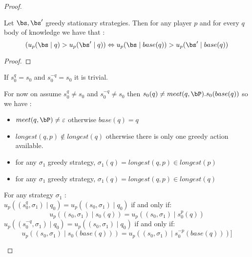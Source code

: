\begin{proof}
	
\begin{mylem}
	\label{lemsup}
	Let $\bs, \bs'$ greedy stationary strategies. Then for any player $p$ and for every $q$ body of knowledge we have that :  $$(u_p(\bs \mid q) > u_p(\bs' \mid q))  \Leftrightarrow  u_p(\bs \mid base(q)) > u_p(\bs' \mid base(q))$$ 
\end{mylem}
\begin{proof}
\end{proof}	
	
If $s^q_0 = s_0$ and  $s^{-q}_0 = s_0$ it is trivial.

For now on assume $s^q_0 \neq s_0$ and $s^{-q}_0 \neq s_0$ then $s_0(q) \neq meet(q,\bP) . s_0(base(q))$ so we have :
\begin{itemize}
	\item $meet(q,\bP) \neq \varepsilon$ otherwise $base(q) = q$
	\item $longest(q,p) \notin longest(q)$ otherwise there is only one greedy action available.
	\item for any $\sigma_1$ greedy strategy, $\sigma_1(q) = longest(q,p)\in longest(p)$ 
	\item for any $\sigma_1$ greedy strategy, $\sigma_1(q) =  longest(q,p)\in longest(q)$ 
\end{itemize}


\begin{mylem}
	\label{lemintermediary}
	For any strategy $\sigma_1$ :
	\\$u_p((s^q_0,\sigma_1) \mid q_0) = u_p((s_0,\sigma_1) \mid q_0)$ if and only if:
	$$u_p((s_0,\sigma_1) \mid s_0(q)) = u_p((s_0,\sigma_1) \mid s^p_0(q))$$ 
	$u_p((s^{-q}_0,\sigma_1) \mid q_0) = u_p((s_0,\sigma_1) \mid q_0)$ if and only if:
	$$u_p((s_0,\sigma_1) \mid s_0(base(q))) = u_p((s_0,\sigma_1) \mid s^{-p}_0(base(q)))]$$ 
\end{mylem}


\end{proof}
